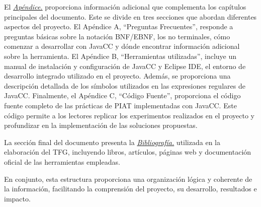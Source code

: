El \hyperref[sec:apendice]{\textit{Apéndice.}} proporciona información adicional que complementa los capítulos principales del documento. Este se divide en tres secciones que abordan diferentes aspectos del proyecto. El Apéndice A, ``Preguntas Frecuentes'', responde a preguntas básicas sobre la notación BNF/EBNF, los no terminales, cómo comenzar a desarrollar con JavaCC y dónde encontrar información adicional sobre la herramienta. El Apéndice B, ``Herramientas utilizadas'', incluye un manual de instalación y configuración de JavaCC y Eclipse IDE, el entorno de desarrollo integrado utilizado en el proyecto. Además, se proporciona una descripción detallada de los símbolos utilizados en las expresiones regulares de JavaCC. Finalmente, el Apéndice C, ``Código Fuente'', proporciona el código fuente completo de las prácticas de PIAT implementadas con JavaCC. Este código permite a los lectores replicar los experimentos realizados en el proyecto y profundizar en la implementación de las soluciones propuestas.


La sección final del documento presenta la \hyperref[sec:bibliografía]{\textit{Bibliografía.}} utilizada en la elaboración del TFG, incluyendo libros, artículos, páginas web y documentación oficial de las herramientas empleadas.

En conjunto, esta estructura proporciona una organización lógica y coherente de la información, facilitando la comprensión del proyecto, su desarrollo, resultados e impacto.
